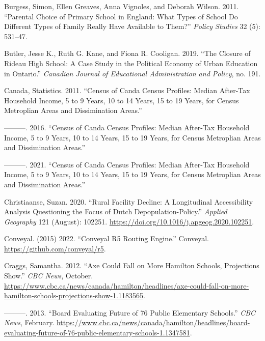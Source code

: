 \documentclass[
default
]{sn-jnl}
\newlength{\cslhangindent}
\newenvironment{CSLReferences}[2] %
 {\begin{list}{}{%
  \setlength{\itemindent}{0pt}
  \setlength{\leftmargin}{0pt}
  \setlength{\parsep}{0pt}
  \ifodd #1
   \setlength{\leftmargin}{\cslhangindent}
   \setlength{\itemindent}{-1\cslhangindent}
  \fi
  \setlength{\itemsep}{#2\baselineskip}}}
 {\end{list}}
\begin{document}
\begin{CSLReferences}{1}{0}
Burgess, Simon, Ellen Greaves, Anna Vignoles, and Deborah Wilson. 2011.
{``Parental Choice of Primary School in England: What Types of School Do
Different Types of Family Really Have Available to Them?''} \emph{Policy
Studies} 32 (5): 531--47.

Butler, Jesse K., Ruth G. Kane, and Fiona R. Cooligan. 2019. {``The
{Closure} of {Rideau High School}: {A Case Study} in the {Political
Economy} of {Urban Education} in {Ontario}.''} \emph{Canadian Journal of
Educational Administration and Policy}, no. 191.

Canada, Statistics. 2011. {``Census of Canda Census Profiles: Median
After-Tax Household Income, 5 to 9 Years, 10 to 14 Years, 15 to 19
Years, for Census Metroplian Areas and Dissimination Areas.''}

---------. 2016. {``Census of Canda Census Profiles: Median After-Tax
Household Income, 5 to 9 Years, 10 to 14 Years, 15 to 19 Years, for
Census Metroplian Areas and Dissimination Areas.''}

---------. 2021. {``Census of Canda Census Profiles: Median After-Tax
Household Income, 5 to 9 Years, 10 to 14 Years, 15 to 19 Years, for
Census Metroplian Areas and Dissimination Areas.''}

Christiaanse, Suzan. 2020. {``Rural Facility Decline: A Longitudinal
Accessibility Analysis Questioning the Focus of Dutch
Depopulation-Policy.''} \emph{Applied Geography} 121 (August): 102251.
\url{https://doi.org/10.1016/j.apgeog.2020.102251}.

Conveyal. (2015) 2022. {``Conveyal {R5 Routing Engine}.''} {Conveyal}.
\url{https://github.com/conveyal/r5}.

Craggs, Samantha. 2012. {``Axe Could Fall on More Hamilton Schools,
Projections Show.''} \emph{{CBC} News}, October.
\url{https://www.cbc.ca/news/canada/hamilton/headlines/axe-could-fall-on-more-hamilton-schools-projections-show-1.1183565}.

---------. 2013. {``Board Evaluating Future of 76 Public Elementary
Schools.''} \emph{{CBC} News}, February.
\url{https://www.cbc.ca/news/canada/hamilton/headlines/board-evaluating-future-of-76-public-elementary-schools-1.1347581}.


\end{CSLReferences}
\end{document}
